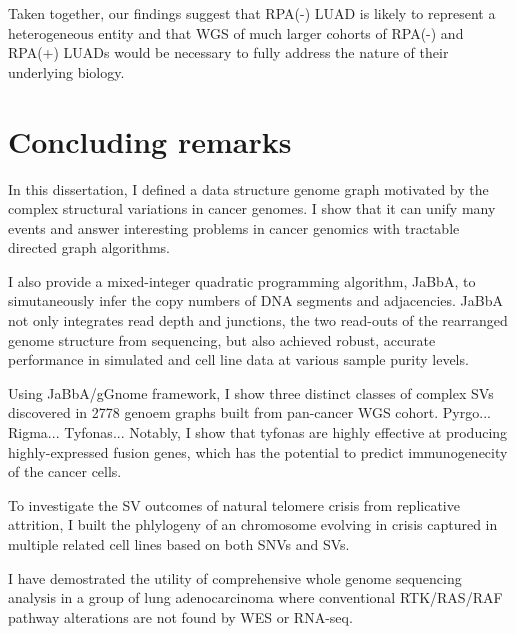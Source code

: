 \documentclass[phd,tocprelim]{cornell}
\begin{document}
Taken together, our findings suggest that RPA(-) LUAD is likely to represent a heterogeneous entity and that WGS of much larger cohorts of RPA(-) and RPA(+) LUADs would be necessary to fully address the nature of their underlying biology.



\chapter*{Concluding remarks}
In this dissertation, I defined a data structure genome graph motivated by the complex structural variations in cancer genomes. I show that it can unify many events and answer interesting problems in cancer genomics with tractable directed graph algorithms.

I also provide a mixed-integer quadratic programming algorithm, JaBbA, to simutaneously infer the copy numbers of DNA segments and adjacencies. JaBbA not only integrates read depth and junctions, the two read-outs of the rearranged genome structure from sequencing, but also achieved robust, accurate performance in simulated and cell line data at various sample purity levels.

Using JaBbA/gGnome framework, I show three distinct classes of complex SVs discovered in 2778 genoem graphs built from pan-cancer WGS cohort. Pyrgo... Rigma... Tyfonas... Notably, I show that tyfonas are highly effective at producing highly-expressed fusion genes, which has the potential to predict immunogenecity of the cancer cells.

To investigate the SV outcomes of natural telomere crisis from replicative attrition, I built the phlylogeny of an chromosome evolving in crisis captured in multiple related cell lines based on both SNVs and SVs.

I have demostrated the utility of comprehensive whole genome sequencing analysis in a group of lung adenocarcinoma where conventional RTK/RAS/RAF pathway alterations are not found by WES or RNA-seq.
\end{document}
